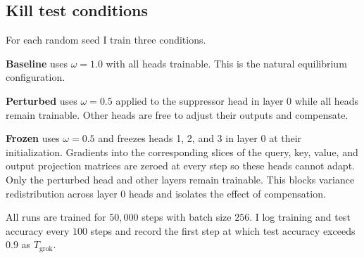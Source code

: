 \subsection{Kill test conditions}

For each random seed I train three conditions.

\textbf{Baseline} uses $\omega = 1.0$ with all heads trainable. This is the natural equilibrium configuration.

\textbf{Perturbed} uses $\omega = 0.5$ applied to the suppressor head in layer 0 while all heads remain trainable. Other heads are free to adjust their outputs and compensate.

\textbf{Frozen} uses $\omega = 0.5$ and freezes heads 1, 2, and 3 in layer 0 at their initialization. Gradients into the corresponding slices of the query, key, value, and output projection matrices are zeroed at every step so these heads cannot adapt. Only the perturbed head and other layers remain trainable. This blocks variance redistribution across layer 0 heads and isolates the effect of compensation.

All runs are trained for $50{,}000$ steps with batch size $256$. I log training and test accuracy every $100$ steps and record the first step at which test accuracy exceeds $0.9$ as $T_{\text{grok}}$.

